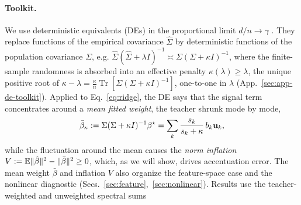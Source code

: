 \paragraph{Toolkit.}
We use deterministic equivalents (DEs) in the proportional limit $d/n\to\gamma$ \citep{dobriban2018high,hastie2022surprises}. They replace functions of the empirical covariance $\hat\Sigma$ by deterministic functions of the population covariance $\Sigma$, e.g. $\hat\Sigma(\hat\Sigma+\lambda I)^{-1}\asymp\Sigma(\Sigma+\kappa I)^{-1}$, where the finite-sample randomness is absorbed into an effective penalty $\kappa(\lambda)\ge\lambda$, the unique positive root of $\kappa-\lambda=\frac{\kappa}{n}\operatorname{Tr}[\Sigma(\Sigma+\kappa I)^{-1}]$, one-to-one in $\lambda$ (App.~\ref{sec:app-de-toolkit}).
Applied to Eq.~\ref{eq:ridge}, the DE says that the signal term concentrates around a \emph{mean fitted weight}, the teacher shrunk mode by mode,
\begin{equation}
\bar\beta_\kappa:=\Sigma(\Sigma+\kappa I)^{-1}{\beta^{\star}}=\sum_k\frac{s_k}{s_k+\kappa}\,b_k{\mathbf{u}}_k ,
\label{eq:pixel-mean-weight}
\end{equation}
while the fluctuation around the mean causes the \emph{norm inflation} $V:=\mathbb{E}\|\hat{\beta}\|^2-\|\bar\beta\|^2\ge0$, which, as we will show, drives accentuation error. The mean weight $\bar\beta$ and inflation $V$ also organize the feature-space case and the nonlinear diagnostic (Secs.~\ref{sec:feature},~\ref{sec:nonlinear}). Results use the teacher-weighted and unweighted spectral sums
